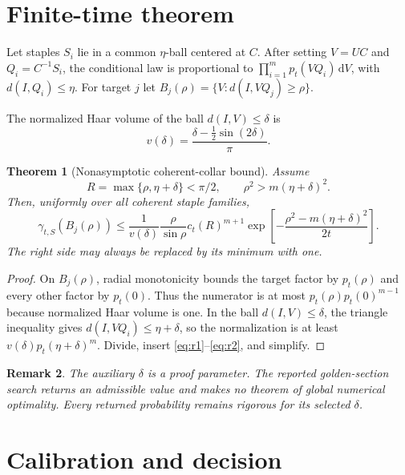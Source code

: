 \documentclass[11pt]{article}
\newtheorem{theorem}{Theorem}[section]
\newtheorem{remark}[theorem]{Remark}
\newcommand{\dd}{\,\mathrm d}
\begin{document}
\section{Finite-time theorem}

Let staples $S_i$ lie in a common $\eta$-ball centered at $C$.  After setting
$V=UC$ and $Q_i=C^{-1}S_i$, the conditional law is proportional to
$\prod_{i=1}^m p_t(VQ_i)\dd V$, with $d(I,Q_i)\leq\eta$.  For target $j$ let
$B_j(\rho)=\{V:d(I,VQ_j)\geq\rho\}$.

The normalized Haar volume of the ball $d(I,V)\leq\delta$ is
\begin{equation}
 v(\delta)=\frac{\delta-\tfrac12\sin(2\delta)}{\pi}.
 \label{eq:volume}
\end{equation}

\begin{theorem}[Nonasymptotic coherent-collar bound]
Assume
\[
 R=\max\{\rho,\eta+\delta\}<\pi/2,
 \qquad \rho^2>m(\eta+\delta)^2.
\]
Then, uniformly over all coherent staple families,
\begin{equation}
 \gamma_{t,S}(B_j(\rho))\leq
 \frac1{v(\delta)}\frac{\rho}{\sin\rho}c_t(R)^{m+1}
 \exp\!\left[-\frac{\rho^2-m(\eta+\delta)^2}{2t}\right].
 \label{eq:main}
\end{equation}
The right side may always be replaced by its minimum with one.
\end{theorem}
\begin{proof}
On $B_j(\rho)$, radial monotonicity bounds the target factor by $p_t(\rho)$
and every other factor by $p_t(0)$.  Thus the numerator is at most
$p_t(\rho)p_t(0)^{m-1}$ because normalized Haar volume is one.  In the ball
$d(I,V)\leq\delta$, the triangle inequality gives
$d(I,VQ_i)\leq\eta+\delta$, so the normalization is at least
$v(\delta)p_t(\eta+\delta)^m$.  Divide, insert
\eqref{eq:r1}--\eqref{eq:r2}, and simplify.
\end{proof}

\begin{remark}
The auxiliary $\delta$ is a proof parameter.  The reported golden-section
search returns an admissible value and makes no theorem of global numerical
optimality.  Every returned probability remains rigorous for its selected
$\delta$.
\end{remark}

\section{Calibration and decision}
\end{document}
